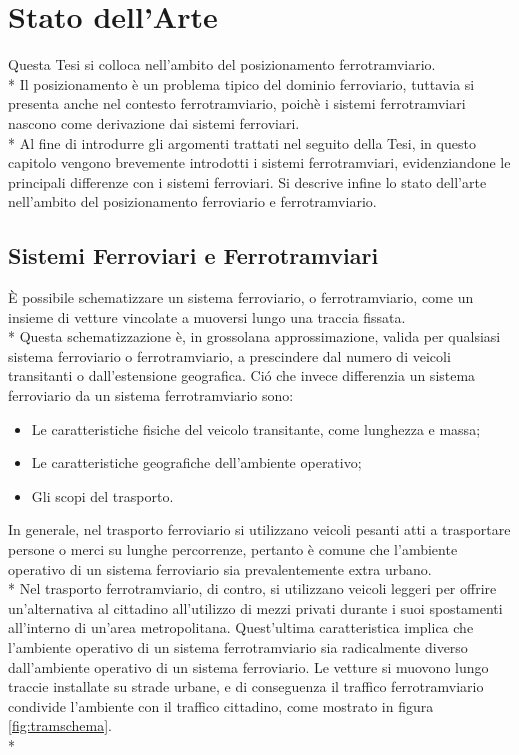 \chapter{Stato dell'Arte}
Questa Tesi si colloca nell'ambito del posizionamento ferrotramviario.\\*
Il posizionamento \`e un problema tipico del dominio ferroviario, tuttavia si presenta anche nel contesto ferrotramviario, poich\`e i sistemi ferrotramviari nascono come derivazione dai sistemi ferroviari.\\*
Al fine di introdurre gli argomenti trattati nel seguito della Tesi, in questo capitolo vengono brevemente introdotti i sistemi ferrotramviari, evidenziandone le principali differenze con i sistemi ferroviari. Si descrive infine lo stato dell'arte nell'ambito del posizionamento ferroviario e ferrotramviario.
\section{Sistemi Ferroviari e Ferrotramviari}
\`E possibile schematizzare un sistema ferroviario, o ferrotramviario, come un insieme di vetture vincolate a muoversi lungo una traccia fissata.\\*
Questa schematizzazione \`e, in grossolana approssimazione, valida per qualsiasi sistema ferroviario o ferrotramviario, a prescindere dal numero di veicoli transitanti o dall'estensione geografica. Ci\'o che invece differenzia un sistema ferroviario da un sistema ferrotramviario sono:
\begin{itemize}
		\item Le caratteristiche fisiche del veicolo transitante, come lunghezza e massa;
		\item Le caratteristiche geografiche dell'ambiente operativo;
		\item Gli scopi del trasporto.
\end{itemize}
In generale, nel trasporto ferroviario si utilizzano veicoli pesanti atti a trasportare persone o merci su lunghe percorrenze, pertanto \`e comune che l'ambiente operativo di un sistema ferroviario sia prevalentemente extra urbano.\\*
Nel trasporto ferrotramviario, di contro, si utilizzano veicoli leggeri per offrire un'alternativa al cittadino all'utilizzo di mezzi privati durante i suoi spostamenti all'interno di un'area metropolitana. Quest'ultima caratteristica implica che l'ambiente operativo di un sistema ferrotramviario sia radicalmente diverso dall'ambiente operativo di un sistema ferroviario. Le vetture si muovono lungo traccie installate su strade urbane, e di conseguenza il traffico ferrotramviario condivide l'ambiente con il traffico cittadino, come mostrato in figura \ref{fig:tramschema}.\\*
